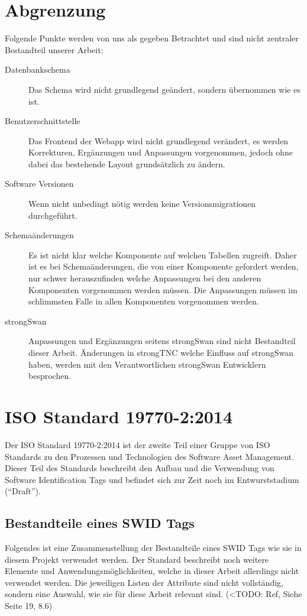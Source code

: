 \section{Abgrenzung}
Folgende Punkte werden von uns als gegeben Betrachtet und sind nicht zentraler
Bestandteil unserer Arbeit:

\begin{description}
	\item[Datenbankschema] Das Schema wird nicht grundlegend
	geändert, sondern übernommen wie es ist.

	\item[Benutzerschnittstelle] Das Frontend der Webapp wird nicht grundlegend
	verändert, es werden Korrekturen, Ergänzungen und Anpassungen vorgenommen,
	jedoch ohne dabei das bestehende Layout grundsätzlich zu ändern.

	\item[Software Versionen] Wenn nicht unbedingt nötig werden keine
	Versionsmigrationen durchgeführt.

	\item[Schemaänderungen] Es ist nicht klar welche Komponente auf welchen
	Tabellen zugreift. Daher ist es bei Schemaänderungen, die von einer Komponente
	gefordert werden, nur schwer herauszufinden welche Anpassungen bei den anderen
	Komponenten vorgenommen werden müssen. Die Anpassungen müssen im schlimmsten
	Falle in allen Komponenten vorgenommen werden.
	
	\item[strongSwan] Anpassungen und Ergänzungen seitens strongSwan sind nicht
	Bestandteil dieser Arbeit. Änderungen in strongTNC welche Einfluss auf
	strongSwan haben, werden mit den Verantwortlichen strongSwan Entwicklern
	besprochen.
\end{description}

\section{ISO Standard 19770-2:2014} 
Der ISO Standard 19770-2:2014 ist der zweite Teil einer Gruppe von ISO Standards
zu den Prozessen und Technologien des Software Asset Management. Dieser Teil des
Standards beschreibt den Aufbau und die Verwendung von Software Identification
Tags und befindet sich zur Zeit noch im Entwurststadium (\enquote{Draft}).

\subsection{Bestandteile eines SWID Tags}
Folgendes ist eine Zusammenstellung der Bestandteile eines SWID Tags wie sie in
diesem Projekt verwendet werden. Der Standard beschreibt noch weitere Elemente
und Anwendungsmöglichkeiten, welche in dieser Arbeit allerdings nicht verwendet
werden. Die jeweiligen Listen der Attribute sind nicht vollständig, sondern eine
Auswahl, wie sie für diese Arbeit relevant sind. (<TODO: Ref, Siehe Seite 19, 8.6)

